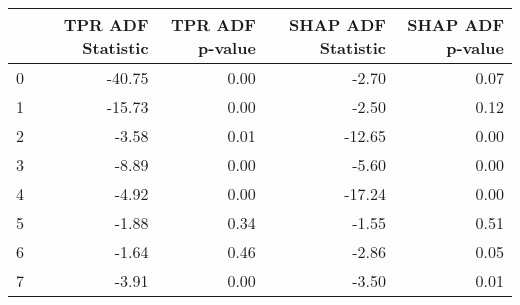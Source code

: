 \begin{tabular}{lrrrr}
\toprule
 & TPR ADF Statistic & TPR ADF p-value & SHAP ADF Statistic & SHAP ADF p-value \\
\midrule
0 & -40.75 & 0.00 & -2.70 & 0.07 \\
1 & -15.73 & 0.00 & -2.50 & 0.12 \\
2 & -3.58 & 0.01 & -12.65 & 0.00 \\
3 & -8.89 & 0.00 & -5.60 & 0.00 \\
4 & -4.92 & 0.00 & -17.24 & 0.00 \\
5 & -1.88 & 0.34 & -1.55 & 0.51 \\
6 & -1.64 & 0.46 & -2.86 & 0.05 \\
7 & -3.91 & 0.00 & -3.50 & 0.01 \\
\bottomrule
\end{tabular}
